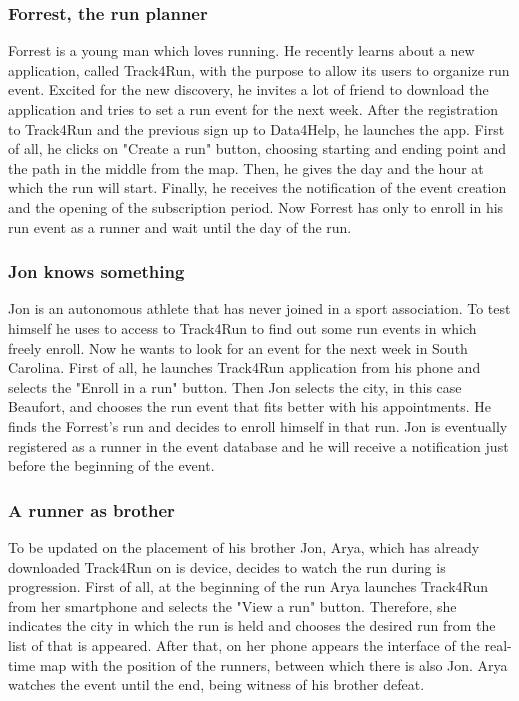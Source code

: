 \documentclass[a4paper]{article}
\begin{document}
    \subsubsection{Forrest, the run planner}
    Forrest is a young man which loves running. He recently learns about a new application, called Track4Run, with the purpose to allow its users to organize run event. Excited for the new discovery, he invites a lot of friend to download the application and tries to set a run event for the next week. \newline
    After the registration to Track4Run and the previous sign up to Data4Help, he launches the app. First of all, he clicks on "Create a run" button, choosing starting and ending point and the path in the middle from the map. Then, he gives the day and the hour at which the run will start. Finally, he receives the notification of the event creation and the opening of the subscription period. \newline
    Now Forrest has only to enroll in his run event as a runner and wait until the day of the run. 
    
    \subsubsection{Jon knows something}
    Jon is an autonomous athlete that has never joined in a sport association. To test himself he uses to access to Track4Run to find out some run events in which freely enroll. Now he wants to look for an event for the next week in South Carolina. \newline
    First of all, he launches Track4Run application from his phone and selects the "Enroll in a run" button. Then Jon selects the city, in this case Beaufort, and chooses the run event that fits better with his appointments. He finds the Forrest's run and decides to enroll himself in that run. \newline
    Jon is eventually registered as a runner in the event database and he will receive a notification just before the beginning of the event.
    
    \subsubsection{A runner as brother}
    To be updated on the placement of his brother Jon, Arya, which has already downloaded Track4Run on is device, decides to watch the run during is progression. \newline
    First of all, at the beginning of the run Arya launches Track4Run from her smartphone and selects the "View a run" button. Therefore, she indicates the city in which the run is held and chooses the desired run from the list of that is appeared. After that, on her phone appears the interface of the real-time map with the position of the runners, between which there is also Jon. \newline
    Arya watches the event until the end, being witness of his brother defeat.
    
\end{document}
